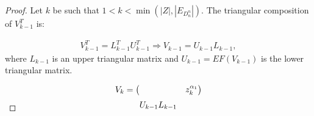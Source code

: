 \documentclass[11pt]{llncs}
\begin{document}
\begin{proof}
    Let $k$ be such that $1<k< \min{\left(|Z|,|E_{D_n^n}|\right)}$. The triangular composition of $V_{k-1}^T$ is:
    
    \begin{align*}
        V_{k-1}^T = L_{k-1}^T U_{k-1}^T \Rightarrow V_{k-1} = U_{k-1} L_{k-1},
    \end{align*}
    where $L_{k-1}$ is an upper triangular matrix and $U_{k-1} = EF\left(V_{k-1}\right)$ is the lower triangular matrix.

\[
V_{k} = 
\begin{pmatrix}
\multicolumn{4}{c}{\multirow{4}{*}{$U_{k-1}L_{k-1}$}} & z_k^{\alpha_1}\\

\end{pmatrix}\]
\end{proof}
\end{document}
